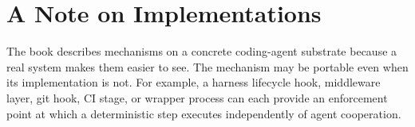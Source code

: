 
\section{A Note on Implementations}\label{heading:a-note-on-implementations}

The book describes mechanisms on a concrete coding-agent substrate because a real system makes them easier to see. The mechanism may be portable even when its implementation is not. For example, a harness lifecycle hook, middleware layer, git hook, CI stage, or wrapper process can each provide an enforcement point at which a deterministic step executes independently of agent cooperation.
